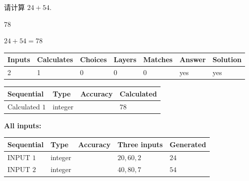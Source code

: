 \documentclass{ctexart}
\begin{document}
  
 
请计算 $ %
24 +  %
54 $.
 
 
 
\noindent{}
 
 

78
 
 
\noindent{}
 
 

 
 
 
\noindent{}
 
 

$ %
24 +  %
54=   %
78$
 
 
\noindent{}
 
 

 
   
   
   
   
\noindent\begin{tabular}{|l|l|l|l|l|l|l|}
 \hline
Inputs & Calculates & Choices & Layers & Matches & Answer & Solution \\ \hline
 2  & 
 1  & 
 0
  & 
 0  & 
 0  & 
  yes & 
  yes 
  \\ \hline
 \end{tabular}
   
   
   
   
\noindent{}
   
   
  
  
\noindent\begin{tabular}{|l|l|l|l|}
\hline
 Sequential & Type & Accuracy & Calculated \\ 
\hline
 
 
  Calculated $  1 $ & integer &  & 
  $ 78 $ 
 \\  \hline  
 \end{tabular}
   
   
   
   
\noindent\vspace{0.1in}\hspace{-0.08in} {\textbf{\Large{All inputs: }}}
   
   
  
  
\noindent\begin{tabular}{|l|l|l|l|l|}
\hline
 Sequential & Type & Accuracy & Three inputs & Generated \\ 
\hline
 
 
  INPUT $  1 $ & integer &  & $
 20
 , 
 60
 , 
 2
 $ & $ 24 $ 
 \\  \hline  
 
 
  INPUT $  2 $ & integer &  & $
 40
 , 
 80
 , 
 7
 $ & $ 54 $ 
 \\  \hline  
 \end{tabular}
   
\end{document}

